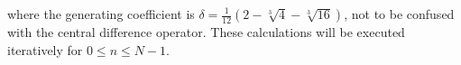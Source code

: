 where the generating coefficient is $\delta = \frac{1}{12}(2-\sqrt[3]{4}-\sqrt[3]{16})$, not to be confused with the central difference operator. These calculations will be executed iteratively for $0 \leq n \leq N-1$. 

